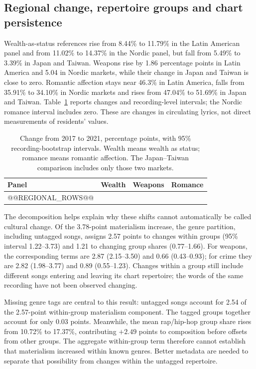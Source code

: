 \subsection{Regional change, repertoire groups and chart persistence}
Wealth-as-status references rise from 8.44\% to 11.79\% in the Latin American panel and from 11.02\% to 14.37\% in the Nordic panel, but fall from 5.49\% to 3.39\% in Japan and Taiwan. Weapons rise by 1.86 percentage points in Latin America and 5.04 in Nordic markets, while their change in Japan and Taiwan is close to zero. Romantic affection stays near 46.3\% in Latin America, falls from 35.91\% to 34.10\% in Nordic markets and rises from 47.04\% to 51.69\% in Japan and Taiwan. Table~\ref{tab:regional-revision} reports changes and recording-level intervals; the Nordic romance interval includes zero. These are changes in circulating lyrics, not direct measurements of residents' values.

\begin{table}[t]
\caption{Change from 2017 to 2021, percentage points, with 95\% recording-bootstrap intervals. Wealth means wealth as status; romance means romantic affection. The Japan--Taiwan comparison includes only those two markets.}
\label{tab:regional-revision}
\centering\small\setlength{\tabcolsep}{5pt}
\begin{tabularx}{\textwidth}{@{}Xrrr@{}}
\toprule Panel & Wealth & Weapons & Romance \\
\midrule
@@REGIONAL_ROWS@@
\bottomrule
\end{tabularx}
\end{table}

The decomposition helps explain why these shifts cannot automatically be called cultural change. Of the 3.78-point materialism increase, the genre partition, including untagged songs, assigns 2.57 points to changes within groups (95\% interval 1.22--3.73) and 1.21 to changing group shares (0.77--1.66). For weapons, the corresponding terms are 2.87 (2.15--3.50) and 0.66 (0.43--0.93); for crime they are 2.82 (1.98--3.77) and 0.89 (0.55--1.23). Changes within a group still include different songs entering and leaving its chart repertoire; the words of the same recording have not been observed changing.

Missing genre tags are central to this result: untagged songs account for 2.54 of the 2.57-point within-group materialism component. The tagged groups together account for only 0.03 points. Meanwhile, the mean rap/hip-hop group share rises from 10.72\% to 17.37\%, contributing $+2.49$ points to composition before offsets from other groups. The aggregate within-group term therefore cannot establish that materialism increased within known genres. Better metadata are needed to separate that possibility from changes within the untagged repertoire.

